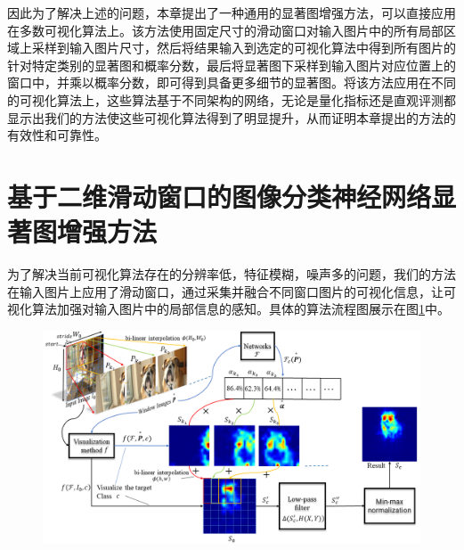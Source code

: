 因此为了解决上述的问题，本章提出了一种通用的显著图增强方法，可以直接应用在多数可视化算法上。该方法使用固定尺寸的滑动窗口对输入图片中的所有局部区域上采样到输入图片尺寸，然后将结果输入到选定的可视化算法中得到所有图片的针对特定类别的显著图和概率分数，最后将显著图下采样到输入图片对应位置上的窗口中，并乘以概率分数，即可得到具备更多细节的显著图。将该方法应用在不同的可视化算法上，这些算法基于不同架构的网络，无论是量化指标还是直观评测都显示出我们的方法使这些可视化算法得到了明显提升，从而证明本章提出的方法的有效性和可靠性。


\section{基于二维滑动窗口的图像分类神经网络显著图增强方法}
为了解决当前可视化算法存在的分辨率低，特征模糊，噪声多的问题，我们的方法在输入图片上应用了滑动窗口，通过采集并融合不同窗口图片的可视化信息，让可视化算法加强对输入图片中的局部信息的感知。具体的算法流程图展示在图\ref{fig:pipeline}中。

\begin{figure}[h]
	\centering 
	\includegraphics[width=15cm]{fig/ch4/pipeline.png}
	\label{fig:pipeline}
\end{figure}

